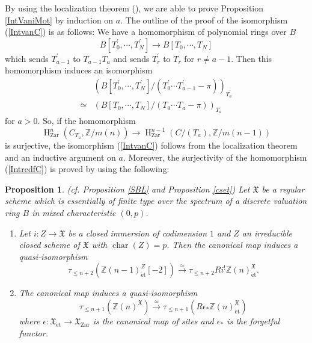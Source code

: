 \documentclass{article}
\newtheorem{prop}[thm]{\indent \sc Proposition}
\newcommand{\et}{\mathrm{\acute{e}t}}
\newcommand{\Zar}{\mathrm{Zar}}
\newcommand{\HO}{\operatorname{H}}
\begin{document}
By using the localization theorem (\cite[p.779, Theorem 3.2.a)]{Ge}),
we are able to prove Proposition \ref{IntVaniMot} by induction on $a$.
The outline of the proof of the isomorphism (\ref{IntvanC}) is as follows:
We have a homomorphism of polynomial rings over $B$
%
\begin{equation*}
B[T^{\prime}_{0}, \cdots, T^{\prime}_{N}]
\to
B[T_{0}, \cdots, T_{N}]
\end{equation*}
%
which sends $T^{\prime}_{a-1}$ to $T_{a-1}T_{a}$ and
sends $T^{\prime}_{r}$ to $T_{r}$ for $r\neq a-1$.
Then this homomorphism induces an isomorphism
%
\begin{align*}
&\left(
B[T^{\prime}_{0}, \cdots, T^{\prime}_{N}]/
(T^{\prime}_{0}\cdots T^{\prime}_{a-1}-\pi)
\right)_{T^{\prime}_{a}}
\\
\simeq
&\left(
B[T_{0}, \cdots, T_{N}]/
(T_{0}\cdots T_{a}-\pi)
\right)_{T_{a}}
\end{align*}
%
for $a>0$. So, if the homomorphism
%
\begin{equation}\label{IntredfC}
\HO^{n}_{\Zar}(
C_{T_{a}},
\mathbb{Z}/m(n)
)    
\to
\HO^{n-1}_{\Zar}(
C/(T_{a}),
\mathbb{Z}/m(n-1)
)
\end{equation}
%
is surjective, the isomorphism (\ref{IntvanC}) follows from the localization theorem and an inductive argument
on $a$.
Moreover, the surjectivity of the homomorphism (\ref{IntredfC}) is proved by using the following:

%
\begin{prop}\upshape\label{IntGenBL}
(cf. Proposition \ref{SBL} and Proposition \ref{cset})
Let $\mathfrak{X}$ be a regular scheme which is essentially of finite type
over the spectrum of a discrete valuation ring $B$ 
in mixed characteristic $(0, p)$.

%
\begin{enumerate}
%
\item Let $i: Z\to \mathfrak{X}$ be a closed immersion of codimension $1$ and 
$Z$ 
an irreducible closed scheme of $\mathfrak{X}$ with $\operatorname{char}(Z)=p$.
Then the canonical map induces a quasi-isomorphism
%
\begin{equation*}
\tau_{\leq n+2}\left(
\mathbb{Z}(n-1)_{\et}^{Z}[-2]
\right)
\xrightarrow{\simeq}
\tau_{\leq n+2}
Ri^{!}\mathbb{Z}(n)_{\et}^{\mathfrak{X}}.
\end{equation*}
%
\item
The canonical map induces a quasi-isomorphism
%
\begin{equation*}
\tau_{\leq n+1}\left(
\mathbb{Z}(n)^{\mathfrak{X}}
\right)
\xrightarrow{\simeq}
\tau_{\leq n+1}\left(
R\epsilon_{*}
\mathbb{Z}(n)_{\et}^{\mathfrak{X}}
\right)
\end{equation*}
%
where
$\epsilon: \mathfrak{X}_{\et}\to\mathfrak{X}_{\Zar}$
is the canonical map of sites and
$\epsilon_{*}$ is the forgetful functor.
\end{enumerate}
%
\end{prop}
%
\end{document}
